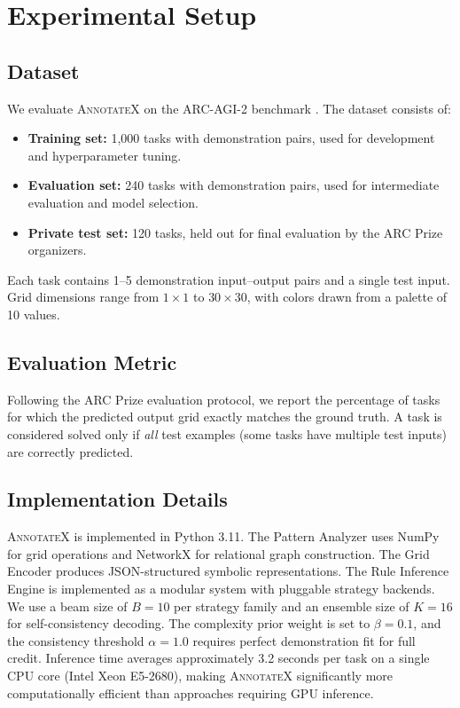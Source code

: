 \documentclass[conference,10pt,letterpaper]{IEEEtran}
\newcommand{\annotatexname}{\textsc{AnnotateX}}
\begin{document}
\section{Experimental Setup}
\label{sec:experimental_setup}

\subsection{Dataset}

We evaluate \annotatexname{} on the ARC-AGI-2 benchmark \cite{arcprize2024}. The dataset consists of:
\begin{itemize}[leftmargin=*,nosep]
    \item \textbf{Training set:} 1,000 tasks with demonstration pairs, used for development and hyperparameter tuning.
    \item \textbf{Evaluation set:} 240 tasks with demonstration pairs, used for intermediate evaluation and model selection.
    \item \textbf{Private test set:} 120 tasks, held out for final evaluation by the ARC Prize organizers.
\end{itemize}

Each task contains 1--5 demonstration input--output pairs and a single test input. Grid dimensions range from $1 \times 1$ to $30 \times 30$, with colors drawn from a palette of 10 values.

\subsection{Evaluation Metric}

Following the ARC Prize evaluation protocol, we report the percentage of tasks for which the predicted output grid exactly matches the ground truth. A task is considered solved only if \emph{all} test examples (some tasks have multiple test inputs) are correctly predicted.

\subsection{Implementation Details}

\annotatexname{} is implemented in Python 3.11. The Pattern Analyzer uses NumPy for grid operations and NetworkX for relational graph construction. The Grid Encoder produces JSON-structured symbolic representations. The Rule Inference Engine is implemented as a modular system with pluggable strategy backends. We use a beam size of $B = 10$ per strategy family and an ensemble size of $K = 16$ for self-consistency decoding. The complexity prior weight is set to $\beta = 0.1$, and the consistency threshold $\alpha = 1.0$ requires perfect demonstration fit for full credit. Inference time averages approximately 3.2 seconds per task on a single CPU core (Intel Xeon E5-2680), making \annotatexname{} significantly more computationally efficient than approaches requiring GPU inference.
\end{document}
